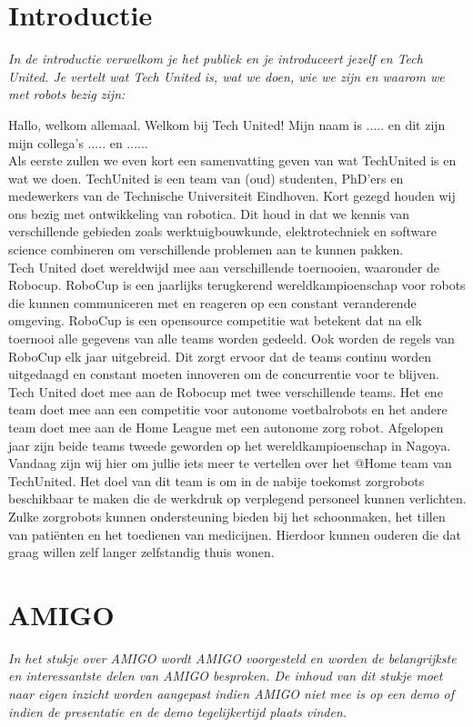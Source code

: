 \documentclass[a4paper,10pt]{article}
\numberwithin{equation}{section}
\numberwithin{figure}{section}
\numberwithin{table}{section}
\begin{document}
\section*{Introductie}
\textit{In de introductie verwelkom je het publiek en je introduceert jezelf en Tech United. Je vertelt wat Tech United is, wat we doen, wie we zijn en waarom we met robots bezig zijn:}\

Hallo, welkom allemaal. Welkom bij Tech United! Mijn naam is ..... en dit zijn mijn collega’s ..... en ...... \\

Als eerste zullen we even kort een samenvatting geven van wat TechUnited is en wat we doen. TechUnited is een team van (oud) studenten, PhD'ers en medewerkers van de Technische Universiteit Eindhoven. Kort gezegd houden wij ons bezig met ontwikkeling van robotica. Dit houd in dat we kennis van verschillende gebieden zoals werktuigbouwkunde, elektrotechniek en software science combineren om verschillende problemen aan te kunnen pakken.\\

Tech United doet wereldwijd mee aan verschillende toernooien, waaronder de Robocup. RoboCup is een jaarlijks terugkerend wereldkampioenschap voor robots die kunnen communiceren met en reageren op een constant veranderende omgeving. RoboCup is een opensource competitie wat betekent dat na elk toernooi alle gegevens van alle teams worden gedeeld. Ook worden de regels van RoboCup elk jaar uitgebreid. Dit zorgt ervoor dat de teams continu worden uitgedaagd en constant moeten innoveren om de concurrentie voor te blijven.\\

Tech United doet mee aan de Robocup met twee verschillende teams. Het ene team doet mee aan een competitie voor autonome voetbalrobots en het andere team doet mee aan de \@ Home League met een autonome zorg robot. Afgelopen jaar zijn beide teams tweede geworden op het wereldkampioenschap in Nagoya.\\

Vandaag zijn wij hier om jullie iets meer te vertellen over het @Home team van TechUnited. Het doel van dit team is om in de nabije toekomst zorgrobots beschikbaar te maken die de werkdruk op verplegend personeel kunnen verlichten. Zulke zorgrobots kunnen  ondersteuning bieden bij het schoonmaken, het tillen van pati\"enten en het toedienen van medicijnen. Hierdoor kunnen ouderen die dat graag willen zelf langer zelfstandig thuis wonen. 

\section*{AMIGO}
\textit{In het stukje over AMIGO wordt AMIGO voorgesteld en worden de belangrijkste en interessantste delen van AMIGO besproken. De inhoud van dit stukje moet naar eigen inzicht worden aangepast indien AMIGO niet mee is op een demo of indien de presentatie en de demo tegelijkertijd plaats vinden. }\\
\end{document}
